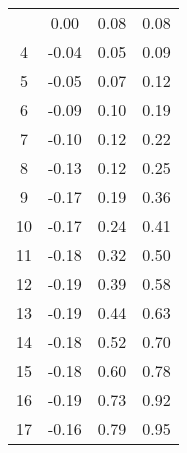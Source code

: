 \begin{longtable}[c]{cccc}
	\endlastfoot
	3                        & 0.00                                 & 0.08                                 & 0.08                       \\
	4                        & -0.04                                & 0.05                                 & 0.09                       \\
	5                        & -0.05                                & 0.07                                 & 0.12                       \\
	6                        & -0.09                                & 0.10                                 & 0.19                       \\
	7                        & -0.10                                & 0.12                                 & 0.22                       \\
	8                        & -0.13                                & 0.12                                 & 0.25                       \\
	9                        & -0.17                                & 0.19                                 & 0.36                       \\
	10                       & -0.17                                & 0.24                                 & 0.41                       \\
	11                       & -0.18                                & 0.32                                 & 0.50                       \\
	12                       & -0.19                                & 0.39                                 & 0.58                       \\
	13                       & -0.19                                & 0.44                                 & 0.63                       \\
	14                       & -0.18                                & 0.52                                 & 0.70                       \\
	15                       & -0.18                                & 0.60                                 & 0.78                       \\
	16                       & -0.19                                & 0.73                                 & 0.92                       \\
	17                       & -0.16                                & 0.79                                 & 0.95                       \\

\end{longtable}

